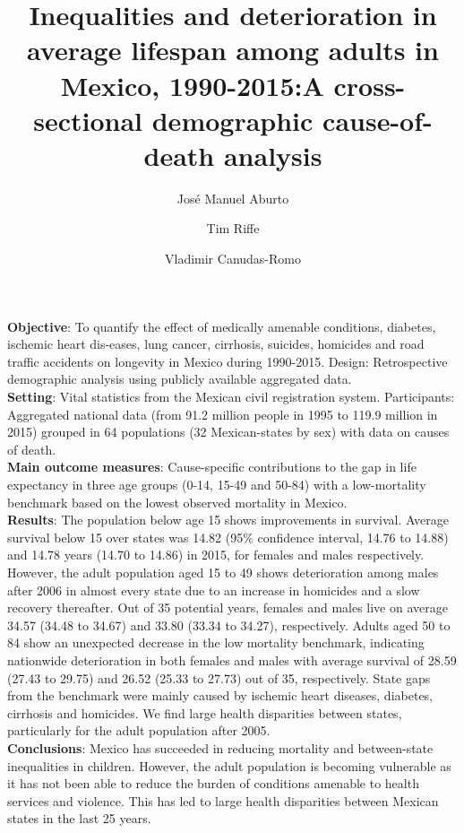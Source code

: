 \documentclass[11.5pt]{article}
\title{Inequalities and deterioration in average lifespan among adults in Mexico, 1990-2015:A cross-sectional demographic cause-of-death analysis}
\author[1]{Jos\'e Manuel Aburto}
\author[2]{Tim Riffe}
\author[3]{Vladimir Canudas-Romo}
\affil[1]{University of Southern Denmark}
\affil[2]{Max Planck Institute for Demographic Research}
\affil[3]{School of Demography, Australian National University}
\begin{document}
\newcommand{\vect}[1]{\boldsymbol{#1}}

\maketitle

\abstract

\textbf{Objective}: To quantify the effect of medically amenable conditions, diabetes, ischemic heart dis-eases, lung cancer, cirrhosis, suicides, homicides and road traffic accidents on longevity in Mexico during 1990-2015.
Design: Retrospective demographic analysis using publicly available aggregated data.\\

\textbf{Setting}: Vital statistics from the Mexican civil registration system.
Participants: Aggregated national data (from 91.2 million people in 1995 to 119.9 million in 2015) grouped in 64 populations (32 Mexican-states by sex) with data on causes of death.\\

\textbf{Main outcome measures}: Cause-specific contributions to the gap in life expectancy in three age groups (0-14, 15-49 and 50-84) with a low-mortality benchmark based on the lowest observed mortality in Mexico.\\

\textbf{Results}: The population below age 15 shows improvements in survival. Average survival below 15 over states was 14.82 (95\% confidence interval, 14.76 to 14.88) and 14.78 years (14.70 to 14.86) in 2015, for females and males respectively. However, the adult population aged 15 to 49 shows deterioration among males after 2006 in almost every state due to an increase in homicides and a slow recovery thereafter. Out of 35 potential years, females and males live on average 34.57 (34.48 to 34.67) and 33.80 (33.34 to 34.27), respectively. Adults aged 50 to 84 show an unexpected decrease in the low mortality benchmark, indicating nationwide deterioration in both females and males with average survival of 28.59 (27.43 to 29.75) and 26.52 (25.33 to 27.73) out of 35, respectively. State gaps from the benchmark were mainly caused by ischemic heart diseases, diabetes, cirrhosis and homicides. We find large health disparities between states, particularly for the adult population after 2005.\\

\textbf{Conclusions}: Mexico has succeeded in reducing mortality and between-state inequalities in children. However, the adult population is becoming vulnerable as it has not been able to reduce the burden of conditions amenable to health services and violence. This has led to large health disparities between Mexican states in the last 25 years.
\end{document}
